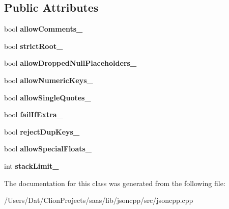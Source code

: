 \subsection*{Public Attributes}
\begin{DoxyCompactItemize}
\item 
bool {\bfseries allow\+Comments\+\_\+}\hypertarget{class_json_1_1_our_features_ac71bb7ba7363d3b05ed76602b036ce33}{}\label{class_json_1_1_our_features_ac71bb7ba7363d3b05ed76602b036ce33}

\item 
bool {\bfseries strict\+Root\+\_\+}\hypertarget{class_json_1_1_our_features_a2095f66a776c0a4ae6cc931a0c94242e}{}\label{class_json_1_1_our_features_a2095f66a776c0a4ae6cc931a0c94242e}

\item 
bool {\bfseries allow\+Dropped\+Null\+Placeholders\+\_\+}\hypertarget{class_json_1_1_our_features_a13963bc44bf948eec1968f7ff8e8f5f1}{}\label{class_json_1_1_our_features_a13963bc44bf948eec1968f7ff8e8f5f1}

\item 
bool {\bfseries allow\+Numeric\+Keys\+\_\+}\hypertarget{class_json_1_1_our_features_af6973fc7e774ce2d634ba99442aeb91a}{}\label{class_json_1_1_our_features_af6973fc7e774ce2d634ba99442aeb91a}

\item 
bool {\bfseries allow\+Single\+Quotes\+\_\+}\hypertarget{class_json_1_1_our_features_abbd6c196d7a22e2a360a59887eda4610}{}\label{class_json_1_1_our_features_abbd6c196d7a22e2a360a59887eda4610}

\item 
bool {\bfseries fail\+If\+Extra\+\_\+}\hypertarget{class_json_1_1_our_features_ae8ad25b90706c78f1a8fe929191ac61b}{}\label{class_json_1_1_our_features_ae8ad25b90706c78f1a8fe929191ac61b}

\item 
bool {\bfseries reject\+Dup\+Keys\+\_\+}\hypertarget{class_json_1_1_our_features_a39b8e0b86b1c24a45e800c023bb715aa}{}\label{class_json_1_1_our_features_a39b8e0b86b1c24a45e800c023bb715aa}

\item 
bool {\bfseries allow\+Special\+Floats\+\_\+}\hypertarget{class_json_1_1_our_features_af760f91cc2a7af37e44f78fb466061bb}{}\label{class_json_1_1_our_features_af760f91cc2a7af37e44f78fb466061bb}

\item 
int {\bfseries stack\+Limit\+\_\+}\hypertarget{class_json_1_1_our_features_a9a786713902d14be6d57a08cc03ccfff}{}\label{class_json_1_1_our_features_a9a786713902d14be6d57a08cc03ccfff}

\end{DoxyCompactItemize}


The documentation for this class was generated from the following file\+:\begin{DoxyCompactItemize}
\item 
/\+Users/\+Dat/\+Clion\+Projects/saas/lib/jsoncpp/src/jsoncpp.\+cpp\end{DoxyCompactItemize}
